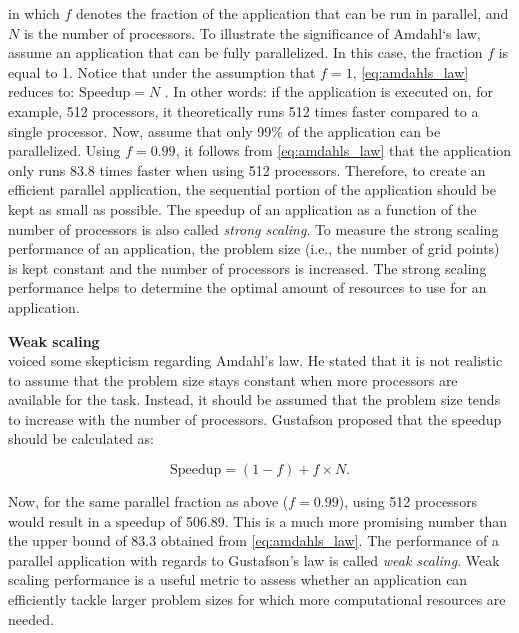 \noindent in which $f$ denotes the fraction of the application that can be run in parallel, and $N$ is the number of processors. To illustrate the significance of Amdahl`s law, assume an application that can be fully parallelized. In this case, the fraction $f$ is equal to 1. Notice that under the assumption that $f=1$, \autoref{eq:amdahls_law} reduces to: $\text{Speedup} = N$ . In other words: if the application is executed on, for example, 512 processors, it theoretically runs 512 times faster compared to a single processor. Now, assume that only 99\% of the application can be parallelized. Using $f=0.99$, it follows from \autoref{eq:amdahls_law} that the application only runs 83.8 times faster when using 512 processors. Therefore, to create an efficient parallel application, the sequential portion of the application should be kept as small as possible. The speedup of an application as a function of the number of processors is also called \emph{strong scaling}. To measure the strong scaling performance of an application, the problem size (i.e., the number of grid points) is kept constant and the number of processors is increased. The strong scaling performance helps to determine the optimal amount of resources to use for an application.

\medskip

\noindent \textbf{Weak scaling} \\
\cite{gustafsonReevaluatingAmdahlLaw1988} voiced some skepticism regarding Amdahl's law. He stated that it is not realistic to assume that the problem size stays constant when more processors are available for the task. Instead, it should be assumed that the problem size tends to increase with the number of processors. Gustafson proposed that the speedup should be calculated as:

\begin{equation}
    \text{Speedup} = (1-f) + f \times N.
    \label{eq:gustafsons_law}
\end{equation}

\noindent Now, for the same parallel fraction as above ($f=0.99$), using 512 processors would result in a speedup of 506.89. This is a much more promising number than the upper bound of 83.3 obtained from \autoref{eq:amdahls_law}. The performance of a parallel application with regards to Gustafson's law is called \emph{weak scaling}. Weak scaling performance is a useful metric to assess whether an application can efficiently tackle larger problem sizes for which more computational resources are needed.

